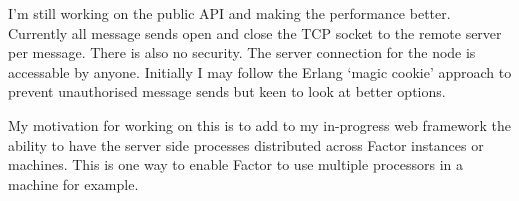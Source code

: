 I'm still working on the public API and making the performance
better. Currently all message sends open and close the TCP socket to
the remote server per message. There is also no security. The server
connection for the node is accessable by anyone. Initially I may
follow the Erlang `magic cookie' approach to prevent unauthorised
message sends but keen to look at better options.

My motivation for working on this is to add to my in-progress web
framework the ability to have the server side processes distributed
across Factor instances or machines. This is one way to enable Factor
to use multiple processors in a machine for example.
